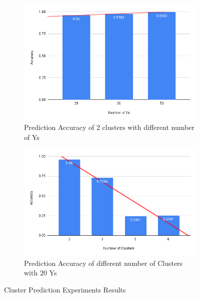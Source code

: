 \documentclass{article}
\begin{document}
\begin{figure}[ht]
  \centering
  \begin{subfigure}{0.49\textwidth}
      \centering
      \includegraphics[width=\textwidth]{images/experiments/dif_ys.png}
      \caption{Prediction Accuracy of 2 clusters with different number of Ys}
  \end{subfigure}
  \hfill
  \begin{subfigure}{0.49\textwidth}
      \centering
      \includegraphics[width=\textwidth]{images/experiments/exp_diff_clusters_2.png} %
      \caption{Prediction Accuracy of different number of Clusters with 20 Ys}
  \end{subfigure}
  \caption{Cluster Prediction Experiments Results}
  \label{fig:exp_res}
\end{figure}
\end{document}
